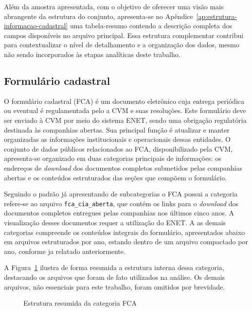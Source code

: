 Além da amostra apresentada, com o objetivo de oferecer uma visão mais abrangente da estrutura do conjunto, apresenta-se no Apêndice~\ref{ap:estrutura-informacao-cadastral} uma tabela-resumo contendo a descrição completa dos campos disponíveis no arquivo principal. Essa estrutura complementar contribui para contextualizar o nível de detalhamento e a organização dos dados, mesmo não sendo incorporados às etapas analíticas deste trabalho.


\subsection{Formulário cadastral}

O formulário cadastral (FCA) é um documento eletrônico cuja entrega periódica ou eventual é regulamentada pelo a CVM e suas resoluções. Este formulário deve ser enviado à CVM por meio do sistema ENET, sendo uma obrigação regulatória destinada às companhias abertas. Sua principal função é atualizar e manter organizadas as informações institucionais e operacionais dessas entidades. O conjunto de dados públicos relacionados ao FCA, disponibilizado pela CVM, apresenta-se organizado em duas categorias principais de informações: os endereços de \textit{download} dos documentos completos submetidos pelas companhias abertas e os conteúdos estruturados das seções que compõem o formulário.

Seguindo o padrão já apresentando de subcategorias o FCA possui a categoria refere-se ao arquivo \texttt{fca\_cia\_aberta}, que contém os links para o \textit{download} dos documentos completos entregues pelas companhias nos últimos cinco anos. A visualização desses documentos requer a utilização do ENET. A as demais categorias compreende os conteúdos integrais do formulário, apresentados abaixo em arquivos estruturados por ano, estando dentro de um arquivo compactado por ano, conforme ja relatado anteriormente. 

A Figura~\ref{fig:estrutura_fca} ilustra de forma resumida a estrutura interna dessa categoria, destacando os arquivos que foram de fato utilizados na análise. Os demais arquivos, não essenciais para este trabalho, foram omitidos por brevidade.

\begin{figure}[!htb]
	\centering
	\caption{Estrutura resumida da categoria FCA}
	\label{fig:estrutura_fca}
	\begin{varwidth}{\linewidth}
	\end{varwidth}
\end{figure}

